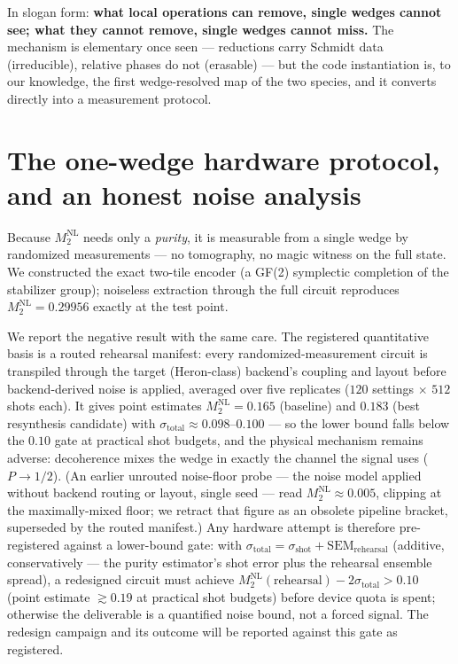 \documentclass[11pt]{article}
\newcommand{\Mtwo}{M_2}
\newcommand{\NL}{\Mtwo^{\mathrm{NL}}}
\begin{document}
\noindent In slogan form: \textbf{what local operations can remove, single
wedges cannot see; what they cannot remove, single wedges cannot miss.} The
mechanism is elementary once seen --- reductions carry Schmidt data
(irreducible), relative phases do not (erasable) --- but the code instantiation
is, to our knowledge, the first wedge-resolved map of the two species, and it
converts directly into a measurement protocol.

\section{The one-wedge hardware protocol, and an honest noise analysis}

Because $\NL$ needs only a \emph{purity}, it is measurable from a single wedge
by randomized measurements --- no tomography, no magic witness on the full
state. We constructed the exact two-tile encoder (a GF(2) symplectic completion
of the stabilizer group); noiseless extraction through the full circuit
reproduces $\NL=0.29956$ exactly at the test point.

We report the negative result with the same care. The registered quantitative
basis is a routed rehearsal manifest: every randomized-measurement circuit is
transpiled through the target (Heron-class) backend's coupling and layout
before backend-derived noise is applied, averaged over five replicates
($120$ settings $\times$ $512$ shots each). It gives point estimates
$\NL = 0.165$ (baseline) and $0.183$ (best resynthesis candidate) with
$\sigma_{\mathrm{total}} \approx 0.098$--$0.100$ --- so the lower bound falls
below the $0.10$ gate at practical shot budgets, and the physical mechanism
remains adverse: decoherence mixes the wedge in exactly the channel the signal
uses ($P\!\to\!1/2$). (An earlier unrouted noise-floor probe --- the noise
model applied without backend routing or layout, single seed --- read
$\NL\approx0.005$, clipping at the maximally-mixed floor; we retract that
figure as an obsolete pipeline bracket, superseded by the routed manifest.) Any hardware attempt is therefore pre-registered
against a lower-bound gate: with $\sigma_{\mathrm{total}} = \sigma_{\mathrm{shot}} +
\mathrm{SEM}_{\mathrm{rehearsal}}$ (additive, conservatively --- the purity
estimator's shot error plus the rehearsal ensemble spread), a redesigned circuit
must achieve ${\NL}\!\left(\text{rehearsal}\right) - 2\sigma_{\mathrm{total}} > 0.10$
(point estimate $\gtrsim 0.19$ at practical shot budgets) before device quota
is spent; otherwise the deliverable is a quantified noise bound, not a forced
signal. The redesign campaign and its outcome will be reported against this
gate as registered.
\end{document}

